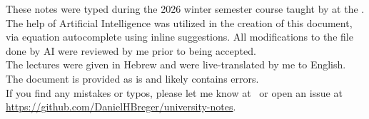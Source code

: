 \begin{myminipage}
	These notes were typed during the 2026 winter semester \textit{\courseloc} course taught by \profloc{} at the \instituteloc{}. 
	\bigskip \\ The help of Artificial Intelligence was utilized in the creation of this document, via equation autocomplete using inline suggestions. All modifications to the file done by AI were reviewed by me prior to being accepted. \bigskip \\ The lectures were given in Hebrew and were live-translated by me to English. The document is provided as is and likely contains errors. 
	\bigskip \\ If you find any mistakes or typos, please let me know at \myemailloc\ or open an issue at \url{https://github.com/DanielHBreger/university-notes}.
\end{myminipage}
